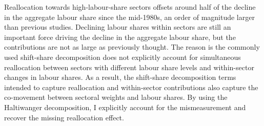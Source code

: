 Reallocation towards high-labour-share sectors offsets around half of the decline in the aggregate labour share since the mid-1980s, an order of magnitude larger than previous studies. Declining labour shares within sectors are still an important force driving the decline in the aggregate labour share, but the contributions are not as large as previously thought. The reason is the commonly used shift-share decomposition does not explicitly account for simultaneous reallocation between sectors with different labour share levels and within-sector changes in labour shares. As a result, the shift-share decomposition terms intended to capture reallocation and within-sector contributions also capture the co-movement between sectoral weights and labour shares. By using the Haltiwanger decomposition, I explicitly account for the mismeasurement and recover the missing reallocation effect. 



